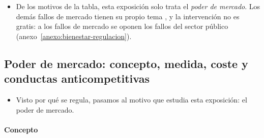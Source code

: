 \documentclass[11pt]{article}
\begin{document}
\begin{itemize}
\item De los motivos de la tabla, esta exposición solo trata el \emph{poder de mercado}. Los demás fallos de mercado tienen su propio tema  , y la intervención no es gratis: a los fallos de mercado se oponen los fallos del sector público  (anexo~\ref{anexo:bienestar-regulacion}).
\end{itemize}

\subsection{Poder de mercado:\cortetitulo{} concepto, medida, coste y conductas anticompetitivas}\label{sec:poder-mercado}

\begin{itemize}
\item Visto por qué se regula, pasamos al motivo que estudia esta exposición: el poder de mercado.
\end{itemize}
\paragraph{Concepto}
\end{document}
